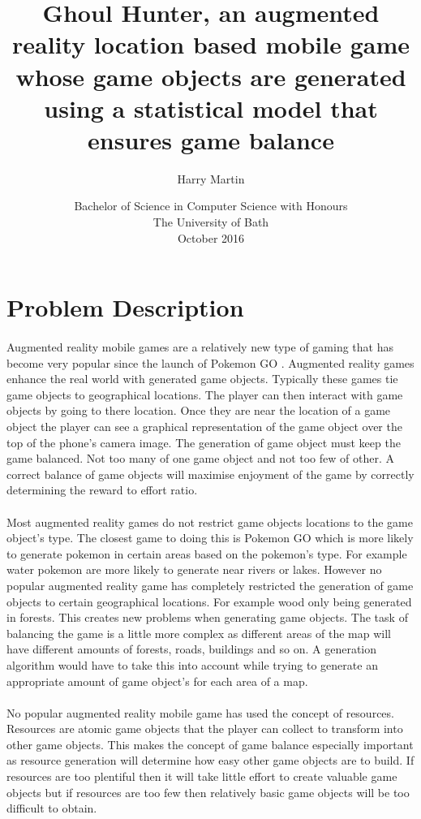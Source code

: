 \documentclass{article}
\title{Ghoul Hunter, an augmented reality location based mobile game whose game objects are generated using a statistical model that ensures game balance}
\author{Harry Martin}
\date{Bachelor of Science in Computer Science with Honours\\The University of Bath\\October 2016}
\begin{document}
	
	\maketitle
	
	\section{Problem Description}
	\paragraph{}Augmented reality mobile games are a relatively new type of gaming that has become very popular since the launch of Pokemon GO \cite{pokemon_go}. Augmented reality games enhance the real world with generated game objects.  Typically these games tie game objects to geographical locations. The player can then interact with game objects by going to there location. Once they are near the location of a game object the player can see a graphical representation of the game object over the top of the phone's camera image. The generation of game object must keep the game balanced. Not too many of one game object and not too few of other. A correct balance of game objects will maximise enjoyment of the game by correctly determining the reward to effort ratio. 
	
	\paragraph{}Most augmented reality games do not restrict game objects locations to the game object's type. The closest game to doing this is Pokemon GO which is more likely to generate pokemon in certain areas based on the pokemon's type. For example water pokemon are more likely to generate near rivers or lakes. However no popular augmented reality game has completely restricted the generation of game objects to certain geographical locations. For example wood only being generated in forests. This creates new problems when generating game objects. The task of balancing the game is a little more complex as different areas of the map will have different amounts of forests, roads, buildings and so on. A generation algorithm would have to take this into account while trying to generate an appropriate amount of game object's for each area of a map. 
	
	\paragraph{}No popular augmented reality mobile game has used the concept of resources. Resources are atomic game objects that the player can collect to transform into other game objects. This makes the concept of game balance especially important as resource generation will determine how easy other game objects are to build. If resources are too plentiful then it will take little effort to create valuable game objects but if resources are too few then relatively basic game objects will be too difficult to obtain. 
	
\end{document}
